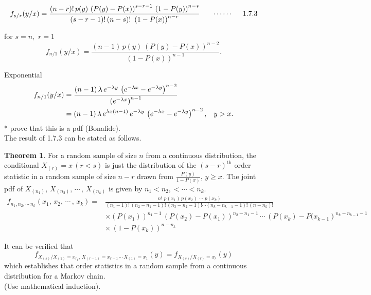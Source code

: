 \documentclass[12pt,a4paper]{report}
\theoremstyle{definition}
\newtheorem{thm}{Theorem}[section]
\theoremstyle{plain}
\begin{document}
$$f_{s/r}(y/x) = \frac{(n - r)!\, p(y)\, \left(P(y) - P(x)\right)^{s - r - 1}\, \left(1 - P(y)\right)^{n - s}}{(s - r - 1)!\, (n - s)!\, \, \left(1 - P(x)\right)^{n - r}}\hspace{0.6cm}\cdots\cdots\hspace{0.5cm} 1.7.3$$

for $s = n, \, \, r = 1$
$$f_{n/1}(y/x) = \frac{(n - 1)\, p(y)\ \left(P(y) - P(x)\right)^{n - 2}}{\left(1 - P(x)\right)^{n - 1}}.$$

Exponential
\begin{align*}
f_{n/1}(y/x) & = \frac{(n - 1)\, \lambda \, e^{-\lambda y}\, \left(e^{-\lambda x} - e^{-\lambda y}\right)^{n - 2}}{\left(e^{-\lambda x}\right)^{n - 1}}\\
& = (n - 1)\, \lambda\, e^{\lambda x (n - 1)}\, e^{-\lambda y}\, \left(e^{-\lambda x}  - e^{-\lambda y}\right)^{n - 2}, \hspace{0.3cm} y > x.
\end{align*}
 * prove that this is a pdf (Bonafide).\\
 
The result of 1.7.3 can be stated as follows.

\begin{thm}
For a random sample of size $n$ from a continuous distribution, the conditional $X_{(r)} = x \, (r < s)$ is just the distribution of the $(s - r)^{\text{th}}$ order statistic in a random sample of size $n - r$ drawn from $\frac{P(y)}{1 - P(x)}, \, y\geq x$.  The joint pdf of $X_{(n_1)}, \, X_{(n_2)}, \, \cdots\, ,\, X_{(n_k)}$ is given by $n_1< n_2,< \cdots < n_k$.
\begin{align*}
f_{n_1, n_2, \cdots\ n_k}(x_1, \, x_2, \, \cdots\, , \,x_k) = & \frac{n!\,\, p(x_1)\, p(x_2)\,\, \cdots\,\, p(x_k)}{(n_1 -1)!\, (n_2 - n_1 - 1)!\, (n_3- n_2 - 1)!\cdots (n_k - n_{k - 1} - 1)!\, (n - n_k)!}\\
& \times \left(P(x_1)\right)^{n_1 - 1}\, \left(P(x_2) - P(x_1)\right)^{n_2 - n_1 - 1}\, \cdots\, \left(P(x_k) - P(x_{k - 1}\right)^{n_k - n_{k - 1} - 1}\\
& \times \, \left(1 - P(x_k)\right)^{n - n_k}
\end{align*}
\end{thm}
It can be verified that 
$$f_{X_{(s)}/X_{(1)} = x_{r_1}, \, X_{(r - 1)} = x_{r - 1}\, \cdots\, X_{(1)} = x_1}(y) = f_{X_{(s)}/X_{(r)} = x_r}(y)$$ 
which establishes that order statistics in a random sample from a continuous distribution for a Markov chain.\\
(Use mathematical induction).\\
\end{document}
